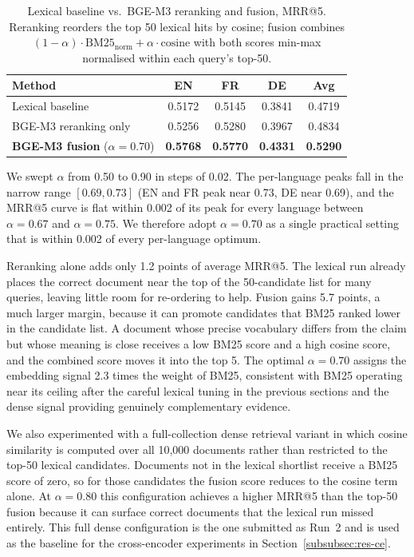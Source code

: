 \begin{table}[!ht]
    \caption{Lexical baseline vs.\ BGE-M3 reranking and fusion, MRR@5. Reranking reorders the top 50 lexical hits by cosine; fusion combines $(1{-}\alpha)\cdot \text{BM25}_{\text{norm}} + \alpha\cdot \text{cosine}$ with both scores min-max normalised within each query's top-50.}
    \label{tab:bge-fusion}
    \centering
    \begin{tabular}{lcccc}
        \toprule
        Method & EN & FR & DE & Avg \\
        \midrule
        Lexical baseline                          & 0.5172 & 0.5145 & 0.3841 & 0.4719 \\
        BGE-M3 reranking only                     & 0.5256 & 0.5280 & 0.3967 & 0.4834 \\
        \textbf{BGE-M3 fusion} ($\alpha{=}0.70$)  & \textbf{0.5768} & \textbf{0.5770} & \textbf{0.4331} & \textbf{0.5290} \\
        \bottomrule
    \end{tabular}
\end{table}

We swept $\alpha$ from 0.50 to 0.90 in steps of 0.02. The per-language peaks fall in the narrow range $[0.69, 0.73]$ (EN and FR peak near 0.73, DE near 0.69), and the MRR@5 curve is flat within 0.002 of its peak for every language between $\alpha{=}0.67$ and $\alpha{=}0.75$. We therefore adopt $\alpha{=}0.70$ as a single practical setting that is within 0.002 of every per-language optimum.

Reranking alone adds only 1.2 points of average MRR@5. The lexical run already places the correct document near the top of the 50-candidate list for many queries, leaving little room for re-ordering to help. Fusion gains 5.7 points, a much larger margin, because it can promote candidates that BM25 ranked lower in the candidate list. A document whose precise vocabulary differs from the claim but whose meaning is close receives a low BM25 score and a high cosine score, and the combined score moves it into the top 5. The optimal $\alpha{=}0.70$ assigns the embedding signal 2.3 times the weight of BM25, consistent with BM25 operating near its ceiling after the careful lexical tuning in the previous sections and the dense signal providing genuinely complementary evidence.

We also experimented with a full-collection dense retrieval variant in which cosine similarity is computed over all 10,000 documents rather than restricted to the top-50 lexical candidates. Documents not in the lexical shortlist receive a BM25 score of zero, so for those candidates the fusion score reduces to the cosine term alone. At $\alpha{=}0.80$ this configuration achieves a higher MRR@5 than the top-50 fusion because it can surface correct documents that the lexical run missed entirely. This full dense configuration is the one submitted as Run~2 and is used as the baseline for the cross-encoder experiments in Section~\ref{subsubsec:res-ce}.

